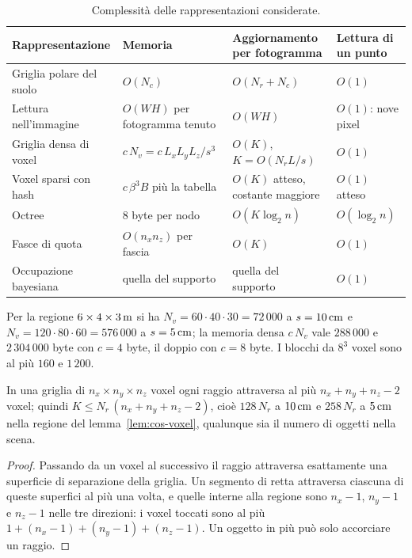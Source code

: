 \begin{table}[H]\centering\small
\caption{Complessità delle rappresentazioni considerate.}\label{tab:cos-complessita}
\begin{tabular}{@{}llll@{}}\toprule
Rappresentazione & Memoria & Aggiornamento per fotogramma & Lettura di un punto\\\midrule
Griglia polare del suolo & $O(N_c)$ & $O(N_r+N_c)$ & $O(1)$\\
Lettura nell'immagine & $O(WH)$ per fotogramma tenuto & $O(WH)$ & $O(1)$: nove pixel\\
Griglia densa di voxel & $c\,N_v=c\,L_xL_yL_z/s^3$ & $O(K)$, $K=O(N_rL/s)$ & $O(1)$\\
Voxel sparsi con hash & $c\,\beta^3B$ più la tabella & $O(K)$ atteso, costante maggiore & $O(1)$ atteso\\
Octree & 8 byte per nodo & $O(K\log_2 n)$ & $O(\log_2 n)$\\
Fasce di quota & $O(n_xn_z)$ per fascia & $O(K)$ & $O(1)$\\
Occupazione bayesiana & quella del supporto & quella del supporto & $O(1)$\\\bottomrule
\end{tabular}
\end{table}

\begin{lemma}\label{lem:cos-voxel}
Per la regione $6\times4\times3\,\mathrm{m}$ si ha $N_v=60\cdot40\cdot30=72\,000$ a $s=10\,\mathrm{cm}$ e $N_v=120\cdot80\cdot60=576\,000$ a $s=5\,\mathrm{cm}$; la memoria densa $c\,N_v$ vale $288\,000$ e $2\,304\,000$ byte con $c=4$ byte, il doppio con $c=8$ byte. I blocchi da $8^3$ voxel sono al più $160$ e $1\,200$. 
\end{lemma}

\begin{lemma}\label{lem:cos-passi}
In una griglia di $n_x\times n_y\times n_z$ voxel ogni raggio attraversa al più $n_x+n_y+n_z-2$ voxel; quindi $K\le N_r\,(n_x+n_y+n_z-2)$, cioè $128\,N_r$ a $10\,\mathrm{cm}$ e $258\,N_r$ a $5\,\mathrm{cm}$ nella regione del lemma~\ref{lem:cos-voxel}, qualunque sia il numero di oggetti nella scena. 
\end{lemma}
\begin{proof}
Passando da un voxel al successivo il raggio attraversa esattamente una superficie di separazione della griglia. Un segmento di retta attraversa ciascuna di queste superfici al più una volta, e quelle interne alla regione sono $n_x-1$, $n_y-1$ e $n_z-1$ nelle tre direzioni: i voxel toccati sono al più $1+(n_x-1)+(n_y-1)+(n_z-1)$. Un oggetto in più può solo accorciare un raggio.
\end{proof}

